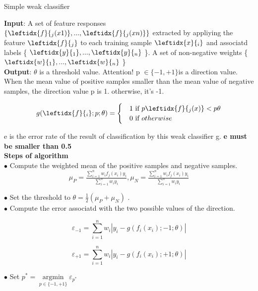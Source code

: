 \documentclass[a4paper, 11pt]{article} %
\DeclareMathOperator*{\argmin}{argmin}
\newcommand*{\argminl}{\argmin\limits}
\begin{document}
    \begin{algorithm}[H]
        \caption{Simple weak classifier}
        \textbf{Input}: A set of feature responses $ \{ \leftidx{f}{_{j} (x1)}, ..., \leftidx{f}{_{j} (xn)} \} $ extracted by appliying the feature $\leftidx{f}{_{j}} $ to each training sample $\leftidx{x}{_{i}} $ and associatd labels \{ $\leftidx{y}{_{1}}, ..., \leftidx{y}{_{n}}$ \}. A set of non-negative weights \{ $\leftidx{w}{_{1}}, ..., \leftidx{w}{_{n}}$ \} \\

        \textbf{Output}: $\theta$ is a threshold value. Attention! p $\in \{-1, +1\} $is a direction value. When the mean value of positive samples smaller than the mean value of negative samples, the direction value p is 1. otherwise, it's -1.

        \begin{equation}
            g(\leftidx{f}{_{i}} ; p; \theta ) = 
            \begin{cases}
                & \text{1 if } p \leftidx{f}{_{j} (x)} < p \theta \\
                & \text{0 if } otherwise
            \end{cases}
            \label{equ:weakClassifier}
        \end{equation}

        e is the error rate of the result of classification by this weak classifier g. \textbf{e must be smaller than 0.5}\\

        \textbf{Steps of algorithm} \\

        $\bullet$  Compute the weighted mean of the positive samples and negative samples.
        \begin{equation}
            \mu_{P} = \tfrac{\sum_{i = 1}^{n} w_{i} f_{j}   (x_{i}) y_{i}}
                                        {\sum_{i=1}^{n} w_{i} y_{i}},
            \mu_{N} = \tfrac{\sum_{i = 1}^{n} w_{i} f_{j}   (x_{i}) y_{i}}
                                        {\sum_{i=1}^{n} w_{i} y_{i}}
        \end{equation}

        $\bullet$ Set the threshold to $\theta = \tfrac{1}{2} (\mu_{P} + \mu_{N})$ .\\

        $\bullet$ Compute the error associatd with the two possible values of the direction.

        \begin{equation}
            \varepsilon_{-1} = \sum_{i = 1}^{n} w_{i} \left | y_{i} - g(f_{i}(x_{i}); -1; \theta) \right |
        \end{equation}

        \begin{equation}
            \varepsilon_{+1} = \sum_{i = 1}^{n} w_{i} \left | y_{i} - g(f_{i}(x_{i}); +1; \theta) \right |
        \end{equation}

        $\bullet$ Set $p^{*} = \argminl_{p \in \{-1, +1\}} \varepsilon_{p^{*}}$
    \end{algorithm}
\end{document}
